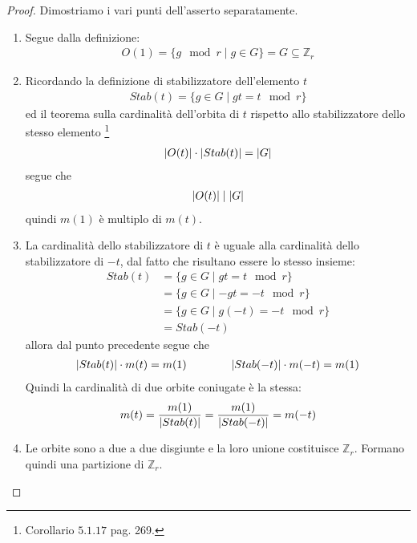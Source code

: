 \begin{proof}
Dimostriamo i vari punti dell'asserto separatamente.
\begin{enumerate}
   \item Segue dalla definizione: 
         \begin{align*}
            O(1) = \lbrace g \mod{r} \mid g \in G \rbrace = G \subseteq  \mathbb{Z}_{r}
         \end{align*}
    \item Ricordando la definizione di stabilizzatore dell'elemento $t$
          \begin{align*}
            Stab(t) = \lbrace g \in G \mid gt = t \mod r \rbrace
          \end{align*}
          ed il teorema sulla cardinalità dell'orbita di $t$ rispetto allo stabilizzatore dello stesso elemento
          \footnote{ \cite{cattaneo} Corollario $5.1.17$ pag. 269.}
          \begin{align*}
            \arrowvert O(t)\arrowvert \cdot \arrowvert Stab(t) \arrowvert = \arrowvert G \arrowvert 
          \end{align*}
          segue che 
          \begin{align*}
            \arrowvert O(t)\arrowvert \mid \arrowvert G \arrowvert 
          \end{align*}
          quindi $m(1)$ è multiplo di $m(t)$.
    \item La cardinalità dello stabilizzatore di $t$ è uguale alla cardinalità dello stabilizzatore
          di $-t$, dal fatto che risultano essere lo stesso insieme: 
          \begin{align*}
            Stab(t) &= \lbrace g \in G \mid gt = t \mod r \rbrace   \\
                    &= \lbrace g \in G \mid -gt = -t \mod r \rbrace \\
                    &= \lbrace g \in G \mid g(-t) = -t \mod r \rbrace \\ 
                    &= Stab(-t)
          \end{align*}
          allora dal punto precedente segue che
          \begin{align*}
            \arrowvert Stab(t)\arrowvert \cdot m(t) = m(1) 
            \qquad \qquad
            \arrowvert Stab(-t)\arrowvert \cdot m(-t) = m(1)
          \end{align*}
          Quindi la cardinalità di due orbite coniugate è la stessa:
          \begin{align*}
            m(t) = \frac{m(1)}{\arrowvert Stab(t)\arrowvert} 
            = \frac{m(1)}{\arrowvert Stab(-t)\arrowvert} = m(-t)
          \end{align*}
      \item Le orbite sono a due a due disgiunte e la loro unione costituisce $\mathbb{Z}_{r}$. Formano quindi una partizione di $\mathbb{Z}_{r}$.
\end{enumerate}
\end{proof}

